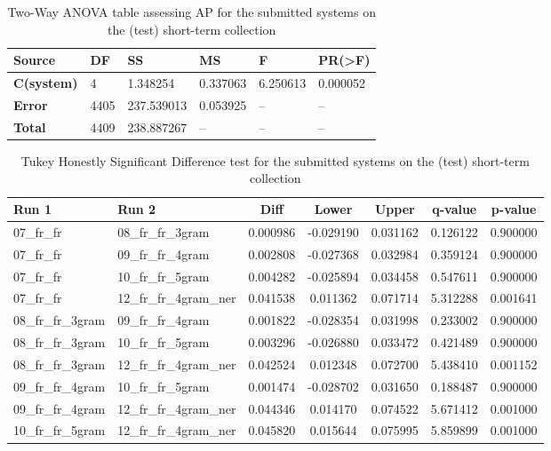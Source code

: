 \begin{table}[h!]
    \centering
    \caption{Two-Way ANOVA table assessing AP for the submitted systems on the (test) short-term collection}
    \label{tab:st_anova}
    \begin{tabular}{|l|l|l|l|l|l|}
    \hline
        \textbf{Source} & \textbf{DF} & \textbf{SS} & \textbf{MS} & \textbf{F} & \textbf{PR(>F)} \\ \hline\hline
        \textbf{C(system)} & 4 & 1.348254 & 0.337063 & 6.250613 & 0.000052 \\ \hline
        \textbf{Error} & 4405 & 237.539013 & 0.053925 & -- & -- \\ \hline
        \textbf{Total} & 4409 & 238.887267 & -- & -- & -- \\ \hline
    \end{tabular}
\end{table}

\begin{table}[h!]
    \centering
    \caption{Tukey Honestly Significant Difference test for the submitted systems on the (test) short-term collection}
    \label{tab:st_comparison}
    \begin{tabular}{|l|l||c|c|c|c|c|}
        \hline
        \textbf{Run 1} & \textbf{Run 2} & \textbf{Diff} & \textbf{Lower} & \textbf{Upper} & \textbf{q-value} & \textbf{p-value} \\ \hline\hline
        07\_fr\_fr & 08\_fr\_fr\_3gram & 0.000986 & -0.029190 & 0.031162 & 0.126122 & 0.900000 \\ \hline
        07\_fr\_fr & 09\_fr\_fr\_4gram & 0.002808 & -0.027368 & 0.032984 & 0.359124 & 0.900000 \\ \hline
        07\_fr\_fr & 10\_fr\_fr\_5gram & 0.004282 & -0.025894 & 0.034458 & 0.547611 & 0.900000 \\ \hline
        07\_fr\_fr & 12\_fr\_fr\_4gram\_ner & 0.041538 & 0.011362 & 0.071714 & 5.312288 & 0.001641 \\ \hline
        08\_fr\_fr\_3gram & 09\_fr\_fr\_4gram & 0.001822 & -0.028354 & 0.031998 & 0.233002 & 0.900000 \\ \hline
        08\_fr\_fr\_3gram & 10\_fr\_fr\_5gram & 0.003296 & -0.026880 & 0.033472 & 0.421489 & 0.900000 \\ \hline
        08\_fr\_fr\_3gram & 12\_fr\_fr\_4gram\_ner & 0.042524 & 0.012348 & 0.072700 & 5.438410 & 0.001152 \\ \hline
        09\_fr\_fr\_4gram & 10\_fr\_fr\_5gram & 0.001474 & -0.028702 & 0.031650 & 0.188487 & 0.900000 \\ \hline
        09\_fr\_fr\_4gram & 12\_fr\_fr\_4gram\_ner & 0.044346 & 0.014170 & 0.074522 & 5.671412 & 0.001000 \\ \hline
        10\_fr\_fr\_5gram & 12\_fr\_fr\_4gram\_ner & 0.045820 & 0.015644 & 0.075995 & 5.859899 & 0.001000 \\ \hline
    \end{tabular}
\end{table}

